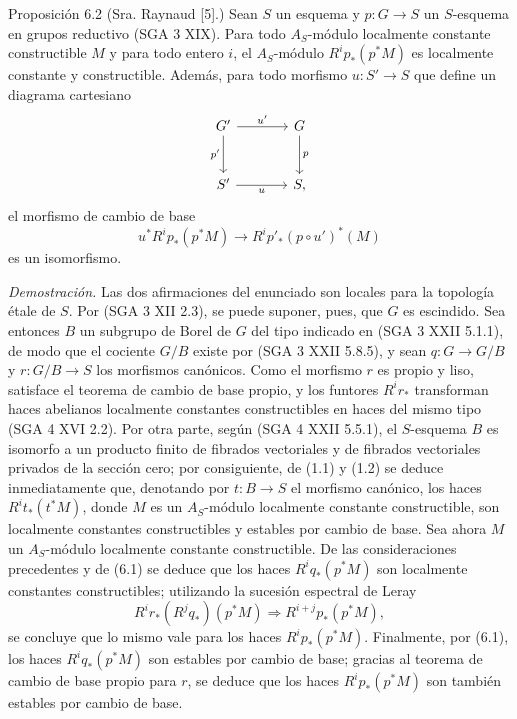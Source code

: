 \begin{statement}{Proposición 6.2}
(Sra. Raynaud [5].) Sean $S$ un esquema y $p:G\to S$ un $S$-esquema en grupos reductivo (SGA 3 XIX). Para todo $A_S$-módulo localmente constante constructible $M$ y para todo entero $i$, el $A_S$-módulo $R^ip_*(p^*M)$ es localmente constante y constructible. Además, para todo morfismo $u:S'\to S$ que define un diagrama cartesiano
\[
\begin{tikzcd}[column sep=large,row sep=large]
G' \arrow[r,"u'"] \arrow[d,"p'"'] & G \arrow[d,"p"]\\
S' \arrow[r,"u"'] & S,
\end{tikzcd}
\]
el morfismo de cambio de base
\[
u^*R^ip_*(p^*M)\to R^ip'_*(p\circ u')^*(M)
\]
es un isomorfismo.
\end{statement}

\emph{Demostración.} Las dos afirmaciones del enunciado son locales para la topología étale de $S$. Por (SGA 3 XII 2.3), se puede suponer, pues, que $G$ es escindido. Sea entonces $B$ un subgrupo de Borel de $G$ del tipo indicado en (SGA 3 XXII 5.1.1), de modo que el cociente $G/B$ existe por (SGA 3 XXII 5.8.5), y sean $q:G\to G/B$ y $r:G/B\to S$ los morfismos canónicos. Como el morfismo $r$ es propio y liso, satisface el teorema de cambio de base propio, y los funtores $R^ir_*$ transforman haces abelianos localmente constantes constructibles en haces del mismo tipo (SGA 4 XVI 2.2). Por otra parte, según (SGA 4 XXII 5.5.1), el $S$-esquema $B$ es isomorfo a un producto finito de fibrados vectoriales y de fibrados vectoriales privados de la sección cero; por consiguiente, de (1.1) y (1.2) se deduce inmediatamente que, denotando por $t:B\to S$ el morfismo canónico, los haces $R^it_*(t^*M)$, donde $M$ es un $A_S$-módulo localmente constante constructible, son localmente constantes constructibles y estables por cambio de base. Sea ahora $M$ un $A_S$-módulo localmente constante constructible. De las consideraciones precedentes y de (6.1) se deduce que los haces $R^iq_*(p^*M)$ son localmente constantes constructibles; utilizando la sucesión espectral de Leray
\[
R^ir_*(R^jq_*)(p^*M)\Rightarrow R^{i+j}p_*(p^*M),
\]
se concluye que lo mismo vale para los haces $R^ip_*(p^*M)$. Finalmente, por (6.1), los haces $R^iq_*(p^*M)$ son estables por cambio de base; gracias al teorema de cambio de base propio para $r$, se deduce que los haces $R^ip_*(p^*M)$ son también estables por cambio de base.
